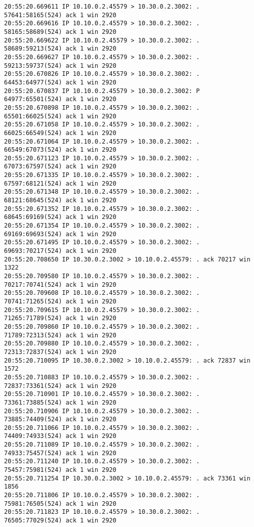 \documentclass[a4paper,12pt]{article}
\begin{document}
\begin{Verbatim}
20:55:20.669611 IP 10.10.0.2.45579 > 10.30.0.2.3002: . 57641:58165(524) ack 1 win 2920
20:55:20.669616 IP 10.10.0.2.45579 > 10.30.0.2.3002: . 58165:58689(524) ack 1 win 2920
20:55:20.669622 IP 10.10.0.2.45579 > 10.30.0.2.3002: . 58689:59213(524) ack 1 win 2920
20:55:20.669627 IP 10.10.0.2.45579 > 10.30.0.2.3002: . 59213:59737(524) ack 1 win 2920
20:55:20.670826 IP 10.10.0.2.45579 > 10.30.0.2.3002: . 64453:64977(524) ack 1 win 2920
20:55:20.670837 IP 10.10.0.2.45579 > 10.30.0.2.3002: P 64977:65501(524) ack 1 win 2920
20:55:20.670898 IP 10.10.0.2.45579 > 10.30.0.2.3002: . 65501:66025(524) ack 1 win 2920
20:55:20.671058 IP 10.10.0.2.45579 > 10.30.0.2.3002: . 66025:66549(524) ack 1 win 2920
20:55:20.671064 IP 10.10.0.2.45579 > 10.30.0.2.3002: . 66549:67073(524) ack 1 win 2920
20:55:20.671123 IP 10.10.0.2.45579 > 10.30.0.2.3002: . 67073:67597(524) ack 1 win 2920
20:55:20.671335 IP 10.10.0.2.45579 > 10.30.0.2.3002: . 67597:68121(524) ack 1 win 2920
20:55:20.671348 IP 10.10.0.2.45579 > 10.30.0.2.3002: . 68121:68645(524) ack 1 win 2920
20:55:20.671352 IP 10.10.0.2.45579 > 10.30.0.2.3002: . 68645:69169(524) ack 1 win 2920
20:55:20.671354 IP 10.10.0.2.45579 > 10.30.0.2.3002: . 69169:69693(524) ack 1 win 2920
20:55:20.671495 IP 10.10.0.2.45579 > 10.30.0.2.3002: . 69693:70217(524) ack 1 win 2920
20:55:20.708650 IP 10.30.0.2.3002 > 10.10.0.2.45579: . ack 70217 win 1322
20:55:20.709580 IP 10.10.0.2.45579 > 10.30.0.2.3002: . 70217:70741(524) ack 1 win 2920
20:55:20.709608 IP 10.10.0.2.45579 > 10.30.0.2.3002: . 70741:71265(524) ack 1 win 2920
20:55:20.709615 IP 10.10.0.2.45579 > 10.30.0.2.3002: . 71265:71789(524) ack 1 win 2920
20:55:20.709860 IP 10.10.0.2.45579 > 10.30.0.2.3002: . 71789:72313(524) ack 1 win 2920
20:55:20.709880 IP 10.10.0.2.45579 > 10.30.0.2.3002: . 72313:72837(524) ack 1 win 2920
20:55:20.710095 IP 10.30.0.2.3002 > 10.10.0.2.45579: . ack 72837 win 1572
20:55:20.710883 IP 10.10.0.2.45579 > 10.30.0.2.3002: . 72837:73361(524) ack 1 win 2920
20:55:20.710901 IP 10.10.0.2.45579 > 10.30.0.2.3002: . 73361:73885(524) ack 1 win 2920
20:55:20.710906 IP 10.10.0.2.45579 > 10.30.0.2.3002: . 73885:74409(524) ack 1 win 2920
20:55:20.711066 IP 10.10.0.2.45579 > 10.30.0.2.3002: . 74409:74933(524) ack 1 win 2920
20:55:20.711089 IP 10.10.0.2.45579 > 10.30.0.2.3002: . 74933:75457(524) ack 1 win 2920
20:55:20.711240 IP 10.10.0.2.45579 > 10.30.0.2.3002: . 75457:75981(524) ack 1 win 2920
20:55:20.711254 IP 10.30.0.2.3002 > 10.10.0.2.45579: . ack 73361 win 1856
20:55:20.711806 IP 10.10.0.2.45579 > 10.30.0.2.3002: . 75981:76505(524) ack 1 win 2920
20:55:20.711823 IP 10.10.0.2.45579 > 10.30.0.2.3002: . 76505:77029(524) ack 1 win 2920

\end{Verbatim}
\end{document}
